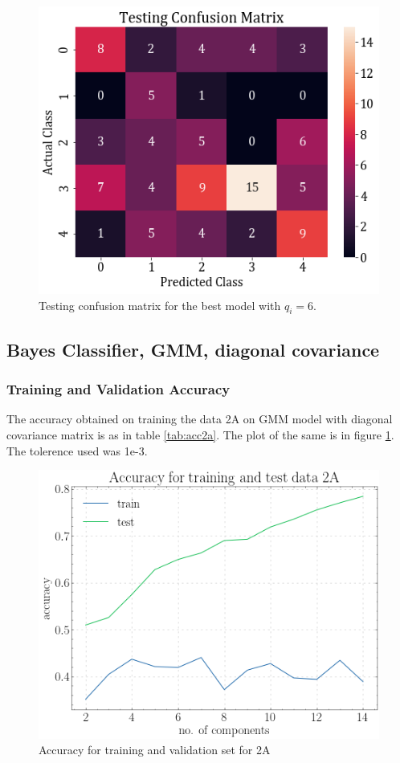 \documentclass[11pt,a4paper]{article}
\begin{document}
\begin{figure}[H]
    \centering
    \includegraphics[scale=0.5]{images/2a_full_test_conf.png}
    \caption{Testing confusion matrix for the best model with $q_i=6$.}
\end{figure}


\subsection{Bayes Classifier, GMM, diagonal covariance}
\subsubsection{Training and Validation Accuracy}
The accuracy obtained on training the data 2A on GMM model with diagonal covariance matrix is as in table \ref{tab:acc2a}. The plot of the same is in figure \ref{fig:acc2adiag}. The tolerence used was 1e-3.


\begin{figure}[H]
    \centering
    \includegraphics[scale = 0.5]{images/acc_2a.png}
    \caption{Accuracy for training and validation set for 2A}
    \label{fig:acc2adiag}
\end{figure}
\end{document}

